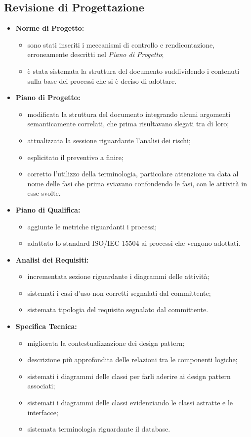 \subsection{Revisione di Progettazione}
\begin{itemize}
\item \textbf{Norme di Progetto:}
	\begin{itemize}
		\item sono stati inseriti i meccanismi di controllo e rendicontazione, erroneamente descritti nel \textit{Piano di Progetto};
		\item è stata sistemata la struttura del documento suddividendo i contenuti sulla base dei processi che si è deciso di adottare.		
	\end{itemize}
\item \textbf{Piano di Progetto:}
	\begin{itemize}
		\item modificata la struttura del documento integrando alcuni argomenti semanticamente correlati, che prima risultavano slegati tra di loro;
		\item attualizzata la sessione riguardante l'analisi dei rischi;
		\item esplicitato il preventivo a finire;
		\item corretto l'utilizzo della terminologia, particolare attenzione va data al nome delle fasi che prima sviavano confondendo le fasi, con le attività in esse svolte.
	\end{itemize}
\item \textbf{Piano di Qualifica:}
	\begin{itemize}
		\item aggiunte le metriche riguardanti i processi;
		\item adattato lo standard ISO/IEC 15504 ai processi che vengono adottati.
	\end{itemize}
\item \textbf{Analisi dei Requisiti:}
	\begin{itemize}
		\item incrementata sezione riguardante i diagrammi delle attività;
		\item sistemati i casi d'uso non corretti segnalati dal committente;
		\item sistemata tipologia del requisito segnalato dal committente.
	\end{itemize}
\item  \textbf{Specifica Tecnica:}
	\begin{itemize}
		\item migliorata la contestualizzazione dei design pattern\glossario{};
		\item descrizione più approfondita delle relazioni tra le componenti logiche;
		\item sistemati i diagrammi delle classi per farli aderire ai design pattern\glossario{} associati;
		\item sistemati i diagrammi delle classi evidenziando le classi astratte e le interfacce;
		\item sistemata terminologia riguardante il database.
	\end{itemize}
\end{itemize}
